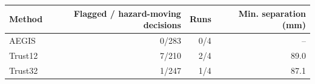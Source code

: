\begin{tabular}{lrrr}
\toprule
Method & Flagged / hazard-moving decisions & Runs & Min. separation (mm)\\
\midrule
AEGIS & 0/283 & 0/4 & --\\
Trust12 & 7/210 & 2/4 & 89.0\\
Trust32 & 1/247 & 1/4 & 87.1\\
\bottomrule
\end{tabular}

